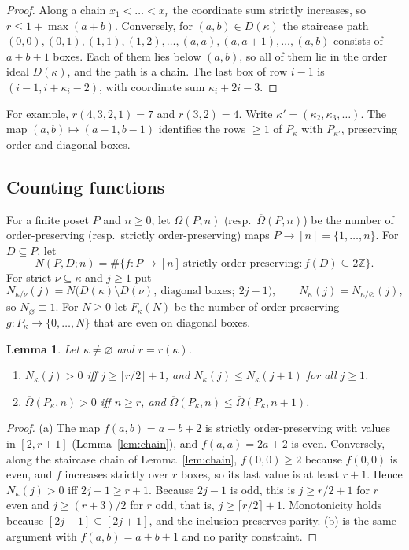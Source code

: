 \documentclass[11pt]{amsart}
\newtheorem{lemma}[theorem]{Lemma}
\theoremstyle{definition}
\theoremstyle{remark}
\newcommand{\Z}{\mathbb{Z}}
\newcommand{\Om}{\Omega}
\newcommand{\Omb}{\overline{\Omega}}
\begin{document}
\begin{proof}
Along a chain $x_1<\dots<x_r$ the coordinate sum strictly increases, so
$r\le1+\max(a+b)$. Conversely, for $(a,b)\in D(\kappa)$ the staircase path
$(0,0),(0,1),(1,1),(1,2),\dots,(a,a),(a,a+1),\dots,(a,b)$ consists of $a+b+1$ boxes. Each of
them lies below $(a,b)$, so all of them lie in the order ideal $D(\kappa)$, and the path is a
chain. The last box of row $i-1$ is $(i-1,i+\kappa_i-2)$, with coordinate sum
$\kappa_i+2i-3$.
\end{proof}

For example, $r(4,3,2,1)=7$ and $r(3,2)=4$. Write $\kappa'=(\kappa_2,\kappa_3,\dots)$. The map
$(a,b)\mapsto(a-1,b-1)$ identifies the rows $\ge1$ of $P_\kappa$ with $P_{\kappa'}$,
preserving order and diagonal boxes.

\subsection{Counting functions}\label{ssec:counts}
For a finite poset $P$ and $n\ge0$, let $\Om(P,n)$ (resp.\ $\Omb(P,n)$) be the number of
order-preserving (resp.\ strictly order-preserving) maps $P\to[n]=\{1,\dots,n\}$. For
$D\subseteq P$, let
\[ N(P,D;n)=\#\{f\colon P\to[n]\ \text{strictly order-preserving}: f(D)\subseteq2\Z\}. \]
For strict $\nu\subseteq\kappa$ and $j\ge1$ put
\[ N_{\kappa/\nu}(j)=N\bigl(D(\kappa)\setminus D(\nu),\ \text{diagonal boxes};\ 2j-1\bigr),\qquad N_\kappa(j)=N_{\kappa/\varnothing}(j), \]
so $N_\varnothing\equiv1$. For $N\ge0$ let $F_\kappa(N)$ be the number of order-preserving
$g\colon P_\kappa\to\{0,\dots,N\}$ that are even on diagonal boxes.

\begin{lemma}\label{lem:Npos}
Let $\kappa\ne\varnothing$ and $r=r(\kappa)$.
\begin{enumerate}[label=(\alph*)]
\item $N_\kappa(j)>0$ iff $j\ge\lceil r/2\rceil+1$, and $N_\kappa(j)\le N_\kappa(j+1)$ for all $j\ge1$.
\item $\Omb(P_\kappa,n)>0$ iff $n\ge r$, and $\Omb(P_\kappa,n)\le\Omb(P_\kappa,n+1)$.
\end{enumerate}
\end{lemma}

\begin{proof}
(a) The map $f(a,b)=a+b+2$ is strictly order-preserving with values in $[2,r+1]$
(Lemma~\ref{lem:chain}), and $f(a,a)=2a+2$ is even. Conversely, along the staircase chain
of Lemma~\ref{lem:chain}, $f(0,0)\ge2$ because $f(0,0)$ is even, and $f$ increases strictly
over $r$ boxes, so its last value is at least $r+1$. Hence $N_\kappa(j)>0$ iff
$2j-1\ge r+1$. Because $2j-1$ is odd, this is $j\ge r/2+1$ for $r$ even and
$j\ge(r+3)/2$ for $r$ odd, that is, $j\ge\lceil r/2\rceil+1$. Monotonicity holds because
$[2j-1]\subseteq[2j+1]$, and the inclusion preserves parity. (b) is the same argument with
$f(a,b)=a+b+1$ and no parity constraint.
\end{proof}
\end{document}
